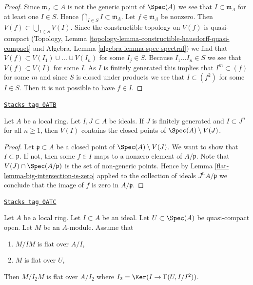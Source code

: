 \begin{proof}
Since $\mathfrak m_A \subset A$ is not the generic point of $\Spec(A)$
we see that $I \subset \mathfrak m_A$ for at least one $I \in S$.
Hence $\bigcap_{I \in S} I \subset \mathfrak m_A$.
Let $f \in \mathfrak m_A$ be nonzero. Then
$V(f) \subset \bigcup_{I \in S} V(I)$.
Since the constructible topology on $V(f)$ is quasi-compact
(Topology, Lemma \ref{topology-lemma-constructible-hausdorff-quasi-compact}
and
Algebra, Lemma \ref{algebra-lemma-spec-spectral})
we find that $V(f) \subset V(I_1) \cup \ldots \cup V(I_n)$
for some $I_j \in S$. Because $I_1 \ldots I_n \in S$ we see that
$V(f) \subset V(I)$ for some $I$. As $I$ is finitely generated
this implies that $I^m \subset (f)$ for some $m$ and since
$S$ is closed under products we see that $I \subset (f^2)$ for
some $I \in S$. Then it is not possible to have $f \in I$.
\end{proof}

\begin{lemma}
\label{flat-lemma-closed-points-complement}
\href{https://stacks.math.columbia.edu/tag/0ATB}{\texttt{Stacks tag 0ATB}}

Let $A$ be a local ring. Let $I, J \subset A$ be ideals.
If $J$ is finitely generated and $I \subset J^n$ for all $n \geq 1$,
then $V(I)$ contains the closed points of $\Spec(A) \setminus V(J)$.
\end{lemma}

\begin{proof}

Let $\mathfrak p \subset A$ be a closed point of $\Spec(A) \setminus V(J)$.
We want to show that $I \subset \mathfrak p$. If not, then some $f \in I$
maps to a nonzero element of $A/\mathfrak p$. Note that
$V(J) \cap \Spec(A/\mathfrak p)$ is the set of non-generic points.
Hence by Lemma \ref{flat-lemma-big-intersection-is-zero} applied
to the collection of ideals $J^nA/\mathfrak p$ we conclude that
the image of $f$ is zero in $A/\mathfrak p$.
\end{proof}

\begin{lemma}
\label{flat-lemma-make-smaller-flatness-ideal}
\href{https://stacks.math.columbia.edu/tag/0ATC}{\texttt{Stacks tag 0ATC}}

Let $A$ be a local ring. Let $I \subset A$ be an ideal.
Let $U \subset \Spec(A)$ be quasi-compact open.
Let $M$ be an $A$-module. Assume that
\begin{enumerate}
\item $M/IM$ is flat over $A/I$,
\item $M$ is flat over $U$,
\end{enumerate}
Then $M/I_2M$ is flat over $A/I_2$ where
$I_2 = \Ker(I \to \Gamma(U, I/I^2))$.
\end{lemma}

